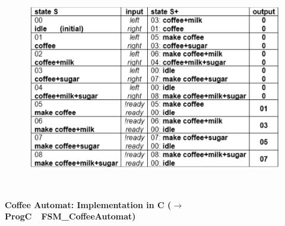 	\begin{figure}[h]
    \centering
    \includegraphics[width=12cm, height=9cm]{Images/image186.png}
    \label{fig:Fig }
    \end{figure} 
     
\textbf{Coffee Automat: Implementation in C	 ($\rightarrow$ ProgC\ \ FSM\_CoffeeAutomat)}\\


